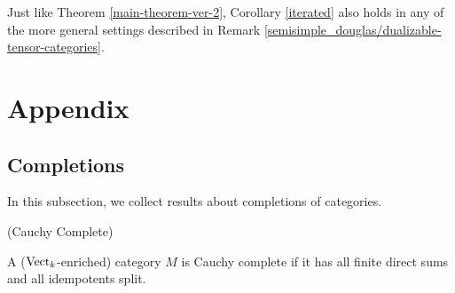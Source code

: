 % 
% 
% 

\begin{remark}
Just like Theorem \ref{main-theorem-ver-2}, Corollary \ref{iterated} also holds in any of the more general settings described in Remark \ref{semisimple_douglas/dualizable-tensor-categories}.
\end{remark}


\appendix
\section{Appendix}
   
\subsection{Completions}

\noindent In this subsection, we collect results about completions of categories.

\begin{definition} (Cauchy Complete)

  \noindent A ($\operatorname{Vect}_k$-enriched) category $M$ is Cauchy complete if it has
  all finite direct sums and all idempotents split.
\end{definition}

